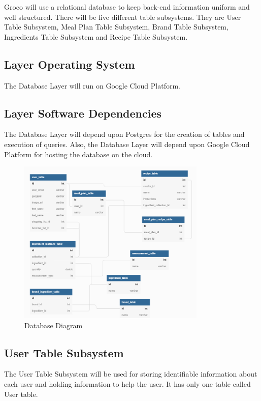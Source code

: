 Groco will use a relational database to keep back-end information uniform and well structured. There will be five different table subsystems. They are User Table Subsystem, Meal Plan Table Subsystem, Brand Table Subsystem, Ingredients Table Subsystem and Recipe Table Subsystem.

\subsection{Layer Operating System}
The Database Layer will run on Google Cloud Platform.

\subsection{Layer Software Dependencies}
The Database Layer will depend upon Postgres for the creation of tables and execution of queries. Also, the Database Layer will depend upon Google Cloud Platform for hosting the database on the cloud. 

\begin{figure}[h!]
	\centering
 	\includegraphics[width=0.80\textwidth]{images/databasenew.png}
 \caption{Database Diagram}
\end{figure}

\subsection{User Table Subsystem}
The User Table Subsystem will be used for storing identifiable information about each user and holding information to help the user. It has only one table called User table.

